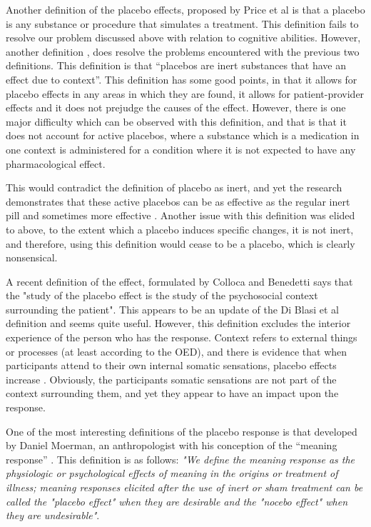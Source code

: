 Another definition of the placebo effects,  proposed by Price et al \cite{Price2008} is that a placebo is any substance or procedure that simulates a treatment. This definition fails to resolve our problem discussed above with relation to cognitive abilities. However, another definition \cite{Blasi2001}, does resolve the problems encountered with the previous two definitions. This definition is that ``placebos are inert substances that have an effect due to context''. This definition has some good points, in that it allows for placebo effects in any areas in which they are found, it allows for patient-provider effects and it does not prejudge the causes of the effect. However, there is one major difficulty which can be observed with this definition, and that is that it does not account for active placebos, where a substance which is a medication in one context is administered for a condition where it is not expected to have any pharmacological effect. 


This would contradict the definition of placebo as inert, and yet the research demonstrates that these active placebos can be as effective as the regular inert pill \cite{Flaten2004} and sometimes more effective \cite{Kirsch2002a}. Another issue with this definition was elided to above, to the extent which a placebo induces specific changes, it is not inert, and therefore, using this definition would cease to be a placebo, which is clearly nonsensical.  

A recent definition of the effect, formulated by Colloca and Benedetti \cite{Colloca2005}  says that the "study of the placebo effect is the study of the psychosocial context surrounding the patient". This appears to be an update of the Di Blasi et al  definition and seems quite useful. However, this definition excludes the interior experience of the person who has the response. Context refers to external things or processes (at least according to the OED), and there is evidence that when participants attend to their own internal somatic sensations, placebo effects increase \cite{Geers2006}. Obviously, the participants somatic sensations are not part of the context surrounding them, and yet they appear to have an impact upon the response. 

One of the most interesting definitions of the placebo response is that developed by Daniel Moerman, an anthropologist with his conception of the ``meaning response'' \cite{Moerman2002b,Moerman2002a}. This definition is as follows: 
	\textit{"We define the meaning response as the physiologic or psychological effects of meaning in the origins or treatment of illness; meaning responses elicited after the use of inert or sham treatment can be called the "placebo effect" when they are desirable and the "nocebo effect" when they are undesirable"}. 

